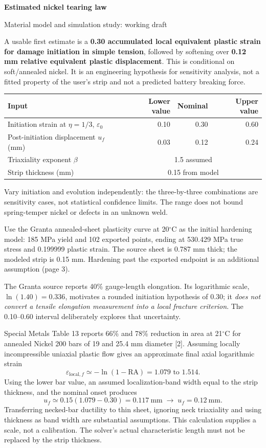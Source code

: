 \documentclass[10pt,a4paper]{article}
\newcommand{\ReportHeading}[1]{\par\vspace{6pt}{\large\bfseries\color{Teal}#1}\par\vspace{3pt}}
\newcommand{\PageTitle}[1]{{\LARGE\bfseries\color{Navy}#1\par}\vspace{7pt}}
\begin{document}
\PageTitle{Estimated nickel tearing law}
{\large\color{Teal}Material model and simulation study: working draft}\par
A usable first estimate is a \textbf{0.30 accumulated local equivalent plastic strain for damage initiation in simple tension}, followed by softening over \textbf{0.12 mm relative equivalent plastic displacement}. This is conditional on soft/annealed nickel. It is an engineering hypothesis for sensitivity analysis, not a fitted property of the user's strip and not a predicted battery breaking force.

\ReportHeading{Proposed inputs}
\begin{center}
\begin{tabular}{p{.45\linewidth}rrr}\toprule
Input & Lower value & Nominal & Upper value\\\midrule
Initiation strain at $\eta=1/3$, $\varepsilon_0$ & 0.10 & 0.30 & 0.60\\
Post-initiation displacement $u_f$ (mm) & 0.03 & 0.12 & 0.24\\
Triaxiality exponent $\beta$ & \multicolumn{3}{c}{1.5 assumed}\\
Strip thickness (mm) & \multicolumn{3}{c}{0.15 from model}\\\bottomrule
\end{tabular}
\end{center}
Vary initiation and evolution independently: the three-by-three combinations are sensitivity cases, not statistical confidence limits. The range does not bound spring-temper nickel or defects in an unknown weld.

Use the Granta annealed-sheet plasticity curve at 20$^\circ$C as the initial hardening model: 185 MPa yield and 102 exported points, ending at 530.429 MPa true stress and 0.199999 plastic strain. The source sheet is 0.787 mm thick; the modeled strip is 0.15 mm. Hardening past the exported endpoint is an additional assumption (page 3).

\ReportHeading{How the estimate was constructed}
The Granta source reports 40\% gauge-length elongation. Its logarithmic scale, $\ln(1.40)=0.336$, motivates a rounded initiation hypothesis of 0.30; it \emph{does not convert a tensile elongation measurement into a local fracture criterion}. The 0.10--0.60 interval deliberately explores that uncertainty.

Special Metals Table 13 reports 66\% and 78\% reduction in area at 21$^\circ$C for annealed Nickel 200 bars of 19 and 25.4 mm diameter [2]. Assuming locally incompressible uniaxial plastic flow gives an approximate final axial logarithmic strain
\[
\varepsilon_{\mathrm{local},f}\simeq-\ln(1-\mathrm{RA})
       =1.079\text{ to }1.514 .
\]
Using the lower bar value, an assumed localization-band width equal to the strip thickness, and the nominal onset produces
\[
u_f \simeq 0.15(1.079-0.30)=0.117\ \mathrm{mm}
          \;\longrightarrow\; \boxed{u_f=0.12\ \mathrm{mm}}.
\]
Transferring necked-bar ductility to thin sheet, ignoring neck triaxiality and using thickness as band width are substantial assumptions. This calculation supplies a scale, not a calibration. The solver's actual characteristic length must not be replaced by the strip thickness.
\end{document}
